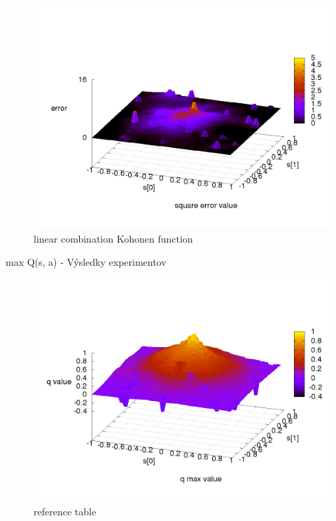 \begin{figure}[!htb]
\centering
\includegraphics[scale=.2]{../../results_q_learning/map_1/function_type_4/q_learning_error.png}
\caption{linear combination Kohonen function}
\end{figure}






max Q(s, a) - Výsledky experimentov


\begin{figure}[!htb]
\centering
\includegraphics[scale=.2]{../../results_q_learning/map_1/function_type_0/iterations_10/q_learning_result.png}
\caption{reference table}
\end{figure}


